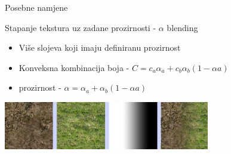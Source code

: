 \documentclass[9pt]{beamer}
\begin{document}
\begin{frame}{Posebne namjene}
	
	\begin{block}{Stapanje tekstura uz zadane prozirnosti - $\alpha$ blending}
		\begin{itemize}
			\item Više slojeva koji imaju definiranu prozirnost
			\item Konveksna kombinacija boja - $C = c_{a}\alpha_{a}+ c_{b}\alpha_{b}(1-\alpha{a})$ 
			\item prozirnost - $\alpha = \alpha_{a}+ \alpha_{b}(1-\alpha{a})$ 
		\end{itemize}
	\end{block}
	\begin{center}
		\includegraphics[width=9cm]{slike/07_prozirnost.png}
	\end{center}
\end{frame}

\end{document}
